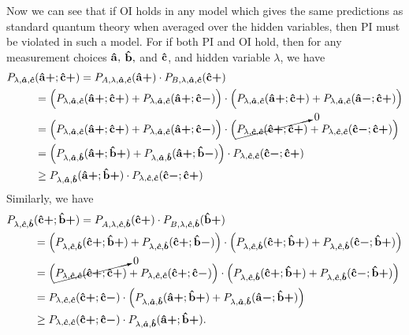 Now we can see that if OI holds in any model which gives the same predictions as standard quantum theory when averaged over the hidden variables, then PI must be violated in such a model. For if both PI and OI hold, then for any measurement choices $\vb{\hat{a}},$ $\vb{\hat{b}},$ and $\vb{\hat{c}}$, and hidden variable $\lambda$, we have
\begin{equation}\label{OIPI1}
\begin{split}
 P_{\lambda,\bm{\hat{a}},\bm{\hat{c}}}&(\vb{\hat{{a}}}\bm{+};\vb{\hat{{c}}}\bm{+})=P_{A,\lambda,\bm{\hat{a}},\bm{\hat{c}}}(\vb{\hat{{a}}}\bm{+})\cdot P_{B,\lambda,\bm{\hat{a}},\bm{\hat{c}}}(\vb{\hat{{c}}}\bm{+})\\
 &= \Big( P_{\lambda,\bm{\hat{a}},\bm{\hat{c}}}(\vb{\hat{{a}}}\bm{+};\vb{\hat{{c}}}\bm{+})+ P_{\lambda,\bm{\hat{a}},\bm{\hat{c}}}(\vb{\hat{{a}}}\bm{+};\vb{\hat{{c}}}\bm{-})\Big)\cdot\Big( P_{\lambda,\bm{\hat{a}},\bm{\hat{c}}}(\vb{\hat{{a}}}\bm{+};\vb{\hat{{c}}}\bm{+})+ P_{\lambda,\bm{\hat{a}},\bm{\hat{c}}}(\vb{\hat{{a}}}\bm{-};\vb{\hat{{c}}}\bm{+})\Big)\\
 &= \Big( P_{\lambda,\bm{\hat{a}},\bm{\hat{c}}}(\vb{\hat{{a}}}\bm{+};\vb{\hat{{c}}}\bm{+})+ P_{\lambda,\bm{\hat{a}},\bm{\hat{c}}}(\vb{\hat{{a}}}\bm{+};\vb{\hat{{c}}}\bm{-})\Big)\cdot\Big( \cancelto{0}{P_{\lambda,\bm{\hat{c}},\bm{\hat{c}}}(\vb{\hat{{c}}}\bm{+};\vb{\hat{{c}}}\bm{+})}+ P_{\lambda,\bm{\hat{c}},\bm{\hat{c}}}(\vb{\hat{{c}}}\bm{-};\vb{\hat{{c}}}\bm{+})\Big)\\
 &=\Big( P_{\lambda,\bm{\hat{a}},\bm{\hat{b}}}(\vb{\hat{{a}}}\bm{+};\vb{\hat{{b}}}\bm{+})+ P_{\lambda,\bm{\hat{a}},\bm{\hat{b}}}(\vb{\hat{{a}}}\bm{+};\vb{\hat{{b}}}\bm{-})\Big)\cdot P_{\lambda,\bm{\hat{c}},\bm{\hat{c}}}(\vb{\hat{{c}}}\bm{-};\vb{\hat{{c}}}\bm{+})\\
 &\geq P_{\lambda,\bm{\hat{a}},\bm{\hat{b}}}(\vb{\hat{{a}}}\bm{+};\vb{\hat{{b}}}\bm{+})\cdot P_{\lambda,\bm{\hat{c}},\bm{\hat{c}}}(\vb{\hat{{c}}}\bm{-};\vb{\hat{{c}}}\bm{+}) 
\end{split}
\end{equation}
Similarly, we have
\begin{equation}\label{OIPI2}
\begin{split}
 P_{\lambda,\bm{\hat{c}},\bm{\hat{b}}}&(\vb{\hat{{c}}}\bm{+};\vb{\hat{{b}}}\bm{+})=P_{A,\lambda,\bm{\hat{c}},\bm{\hat{b}}}(\vb{\hat{{c}}}\bm{+})\cdot P_{B,\lambda,\bm{\hat{c}},\bm{\hat{b}}}(\vb{\hat{{b}}}\bm{+})\\
 &= \Big( P_{\lambda,\bm{\hat{c}},\bm{\hat{b}}}(\vb{\hat{{c}}}\bm{+};\vb{\hat{{b}}}\bm{+})+ P_{\lambda,\bm{\hat{c}},\bm{\hat{b}}}(\vb{\hat{{c}}}\bm{+};\vb{\hat{{b}}}\bm{-})\Big)\cdot\Big( P_{\lambda,\bm{\hat{c}},\bm{\hat{b}}}(\vb{\hat{{c}}}\bm{+};\vb{\hat{{b}}}\bm{+})+ P_{\lambda,\bm{\hat{c}},\bm{\hat{b}}}(\vb{\hat{{c}}}\bm{-};\vb{\hat{{b}}}\bm{+})\Big)\\
 &= \Big(  \cancelto{0}{P_{\lambda,\bm{\hat{c}},\bm{\hat{c}}}(\vb{\hat{{c}}}\bm{+};\vb{\hat{{c}}}\bm{+})}+ P_{\lambda,\bm{\hat{c}},\bm{\hat{c}}}(\vb{\hat{{c}}}\bm{+};\vb{\hat{{c}}}\bm{-})\Big)\cdot\Big(P_{\lambda,\bm{\hat{c}},\bm{\hat{b}}}(\vb{\hat{{c}}}\bm{+};\vb{\hat{{b}}}\bm{+})+ P_{\lambda,\bm{\hat{c}},\bm{\hat{b}}}(\vb{\hat{{c}}}\bm{-};\vb{\hat{{b}}}\bm{+})\Big)\\
 &=P_{\lambda,\bm{\hat{c}},\bm{\hat{c}}}(\vb{\hat{{c}}}\bm{+};\vb{\hat{{c}}}\bm{-})\cdot\Big( P_{\lambda,\bm{\hat{a}},\bm{\hat{b}}}(\vb{\hat{{a}}}\bm{+};\vb{\hat{{b}}}\bm{+})+ P_{\lambda,\bm{\hat{a}},\bm{\hat{b}}}(\vb{\hat{{a}}}\bm{-};\vb{\hat{{b}}}\bm{+})\Big)\\
 &\geq P_{\lambda,\bm{\hat{c}},\bm{\hat{c}}}(\vb{\hat{{c}}}\bm{+};\vb{\hat{{c}}}\bm{-})\cdot P_{\lambda,\bm{\hat{a}},\bm{\hat{b}}}(\vb{\hat{{a}}}\bm{+};\vb{\hat{{b}}}\bm{+}) .
\end{split}
\end{equation}
